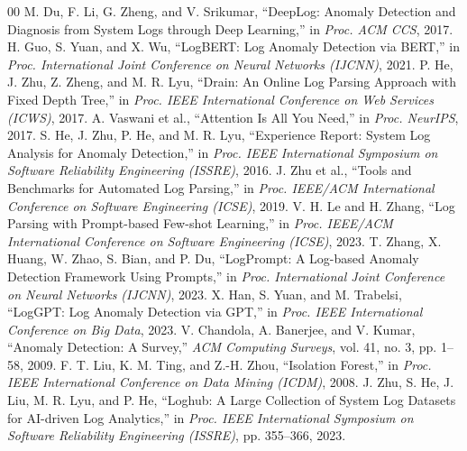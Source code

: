\documentclass[conference]{IEEEtran}
\begin{document}
\begin{thebibliography}{00}
 M. Du, F. Li, G. Zheng, and V. Srikumar, ``DeepLog: Anomaly Detection and Diagnosis from System Logs through Deep Learning,'' in \textit{Proc. ACM CCS}, 2017.
 H. Guo, S. Yuan, and X. Wu, ``LogBERT: Log Anomaly Detection via BERT,'' in \textit{Proc. International Joint Conference on Neural Networks (IJCNN)}, 2021.
 P. He, J. Zhu, Z. Zheng, and M. R. Lyu, ``Drain: An Online Log Parsing Approach with Fixed Depth Tree,'' in \textit{Proc. IEEE International Conference on Web Services (ICWS)}, 2017.
 A. Vaswani et al., ``Attention Is All You Need,'' in \textit{Proc. NeurIPS}, 2017.
 S. He, J. Zhu, P. He, and M. R. Lyu, ``Experience Report: System Log Analysis for Anomaly Detection,'' in \textit{Proc. IEEE International Symposium on Software Reliability Engineering (ISSRE)}, 2016.
 J. Zhu et al., ``Tools and Benchmarks for Automated Log Parsing,'' in \textit{Proc. IEEE/ACM International Conference on Software Engineering (ICSE)}, 2019.
 V. H. Le and H. Zhang, ``Log Parsing with Prompt-based Few-shot Learning,'' in \textit{Proc. IEEE/ACM International Conference on Software Engineering (ICSE)}, 2023.
 T. Zhang, X. Huang, W. Zhao, S. Bian, and P. Du, ``LogPrompt: A Log-based Anomaly Detection Framework Using Prompts,'' in \textit{Proc. International Joint Conference on Neural Networks (IJCNN)}, 2023.
 X. Han, S. Yuan, and M. Trabelsi, ``LogGPT: Log Anomaly Detection via GPT,'' in \textit{Proc. IEEE International Conference on Big Data}, 2023.
 V. Chandola, A. Banerjee, and V. Kumar, ``Anomaly Detection: A Survey,'' \textit{ACM Computing Surveys}, vol. 41, no. 3, pp. 1--58, 2009.
 F. T. Liu, K. M. Ting, and Z.-H. Zhou, ``Isolation Forest,'' in \textit{Proc. IEEE International Conference on Data Mining (ICDM)}, 2008.
 J. Zhu, S. He, J. Liu, M. R. Lyu, and P. He, ``Loghub: A Large Collection of System Log Datasets for AI-driven Log Analytics,'' in \textit{Proc. IEEE International Symposium on Software Reliability Engineering (ISSRE)}, pp. 355--366, 2023.
\end{thebibliography}
\end{document}

